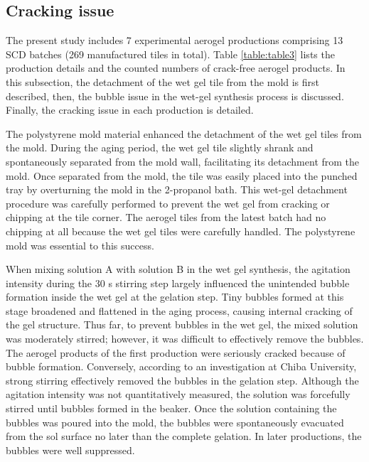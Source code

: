 \documentclass[5p,twocolumn]{elsarticle}
\begin{document}
\subsection{Cracking issue}
\label{5-1}

The present study includes 7 experimental aerogel productions comprising 13 SCD batches (269 manufactured tiles in total). Table \ref{table:table3} lists the production details and the counted numbers of crack-free aerogel products. In this subsection, the detachment of the wet gel tile from the mold is first described, then, the bubble issue in the wet-gel synthesis process is discussed. Finally, the cracking issue in each production is detailed.

The polystyrene mold material enhanced the detachment of the wet gel tiles from the mold. During the aging period, the wet gel tile slightly shrank and spontaneously separated from the mold wall, facilitating its detachment from the mold. Once separated from the mold, the tile was easily placed into the punched tray by overturning the mold in the 2-propanol bath. This wet-gel detachment procedure was carefully performed to prevent the wet gel from cracking or chipping at the tile corner. The aerogel tiles from the latest batch had no chipping at all because the wet gel tiles were carefully handled. The polystyrene mold was essential to this success.

When mixing solution A with solution B in the wet gel synthesis, the agitation intensity during the 30 s stirring step largely influenced the unintended bubble formation inside the wet gel at the gelation step. Tiny bubbles formed at this stage broadened and flattened in the aging process, causing internal cracking of the gel structure. Thus far, to prevent bubbles in the wet gel, the mixed solution was moderately stirred; however, it was difficult to effectively remove the bubbles. The aerogel products of the first production were seriously cracked because of bubble formation. Conversely, according to an investigation at Chiba University, strong stirring effectively removed the bubbles in the gelation step. Although the agitation intensity was not quantitatively measured, the solution was forcefully stirred until bubbles formed in the beaker. Once the solution containing the bubbles was poured into the mold, the bubbles were spontaneously evacuated from the sol surface no later than the complete gelation. In later productions, the bubbles were well suppressed.
\end{document}
